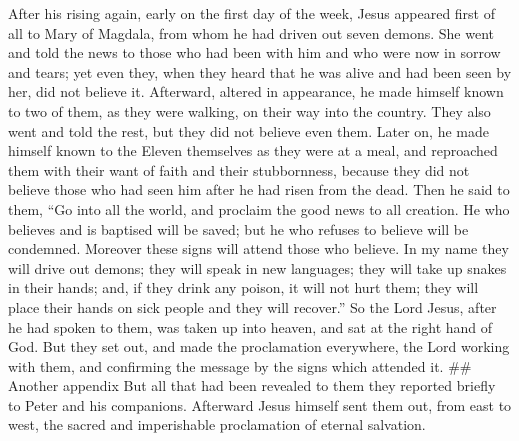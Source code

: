  After his rising again, early on the first day of the week,
Jesus appeared first of all to Mary of Magdala, from whom he had driven
out seven demons.  She went and told the news to those who
had been with him and who were now in sorrow and tears; 
yet even they, when they heard that he was alive and had been seen by
her, did not believe it.  Afterward, altered in appearance,
he made himself known to two of them, as they were walking, on their way
into the country.  They also went and told the rest, but
they did not believe even them.  Later on, he made himself
known to the Eleven themselves as they were at a meal, and reproached
them with their want of faith and their stubbornness, because they did
not believe those who had seen him after he had risen from the dead.
 Then he said to them, ``Go into all the world, and
proclaim the good news to all creation.  He who believes
and is baptised will be saved; but he who refuses to believe will be
condemned.  Moreover these signs will attend those who
believe. In my name they will drive out demons; they will speak in new
languages;  they will take up snakes in their hands; and,
if they drink any poison, it will not hurt them; they will place their
hands on sick people and they will recover.''  So the Lord
Jesus, after he had spoken to them, was taken up into heaven, and sat at
the right hand of God.  But they set out, and made the
proclamation everywhere, the Lord working with them, and confirming the
message by the signs which attended it. \#\# Another appendix But all
that had been revealed to them they reported briefly to Peter and his
companions. Afterward Jesus himself sent them out, from east to west,
the sacred and imperishable proclamation of eternal salvation.
